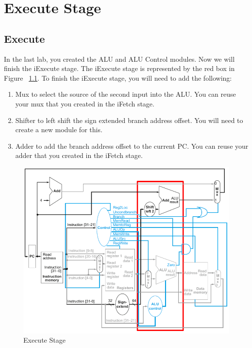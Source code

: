\chapter{Execute Stage}

\section{Execute}

In the last lab, you created the ALU and ALU Control modules.  Now we will finish the iExecute stage.  The iExecute stage is represented by the red box in Figure ~\ref{fig:execute_stage}.  To finish the iExecute stage, you will need to add the following:
 
\begin{enumerate}
	\item Mux to select the source of the second input into the ALU.  You can reuse your mux that you created in the iFetch stage.
	\item Shifter to left shift the sign extended branch address offset.  You will need to create a new module for this.
	\item Adder to add the branch address offset to the current PC.  You can reuse your adder that you created in the iFetch stage.
\end{enumerate} 

\begin{figure}
	\caption{Execute Stage}\label{fig:execute_stage}
	\begin{center}
		\includegraphics[width=4.75in]{../images/execute_stage.png}
	\end{center}
\end{figure} 

